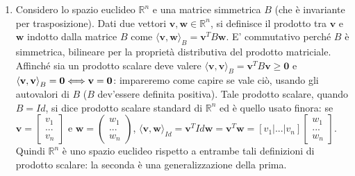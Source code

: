 \documentclass{article}
\begin{document}
\begin{enumerate}
\item Considero lo spazio euclideo $%
\mathbb{R}
^{n}$ e una matrice simmetrica $B$ (che \`{e} invariante per trasposizione).
Dati due vettori $\mathbf{v,w}\in 
\mathbb{R}
^{n}$, si definisce il prodotto tra $\mathbf{v}$ e $\mathbf{w}$ indotto
dalla matrice $B$ come $\langle \mathbf{v,w\rangle }_{B}=\mathbf{v}^{T}B%
\mathbf{w}$. E' commutativo perch\'{e} $B$ \`{e} simmetrica, bilineare per
la propriet\`{a} distributiva del prodotto matriciale. Affinch\'{e} sia un
prodotto scalare deve valere $\langle \mathbf{v,v\rangle }_{B}=\mathbf{v}%
^{T}B\mathbf{v\geq 0}$ e $\langle \mathbf{v,v\rangle }_{B}=\mathbf{%
0\Longleftrightarrow v=0}$: impareremo come capire se vale ci\`{o}, usando
gli autovalori di $B$ ($B$ dev'essere definita positiva). Tale prodotto
scalare, quando $B=Id$, si dice prodotto scalare standard di $%
\mathbb{R}
^{n}$ ed \`{e} quello usato finora: se $\mathbf{v}=\left[ 
\begin{array}{c}
v_{1} \\ 
... \\ 
v_{n}%
\end{array}%
\right] $ e $\mathbf{w}=\left( 
\begin{array}{c}
w_{1} \\ 
... \\ 
w_{n}%
\end{array}%
\right) $, $\langle \mathbf{v,w\rangle }_{Id}=\mathbf{v}^{T}Id\mathbf{w=v}%
^{T}\mathbf{w=}\left[ v_{1}|...|v_{n}\right] \left[ 
\begin{array}{c}
w_{1} \\ 
... \\ 
w_{n}%
\end{array}%
\right] $. Quindi $%
\mathbb{R}
^{n}$ \`{e} uno spazio euclideo rispetto a entrambe tali definizioni di
prodotto scalare: la seconda \`{e} una generalizzazione della prima.


\end{enumerate}
\end{document}
